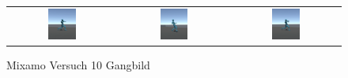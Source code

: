 \begin{figure}[H]
\begin{tabular}{ccc}
    \includegraphics[width=0.27\textwidth]{img/charakter_mixamo_galoppieren4} & \includegraphics[width=0.27\textwidth]{img/charakter_mixamo_galoppieren5} & \includegraphics[width=0.27\textwidth]{img/charakter_mixamo_galoppieren6} \\
  \end{tabular}
  \caption{Mixamo Versuch 10 Gangbild}
  \label{fig:mixamo_versuch10_gangbild}
\end{figure}

